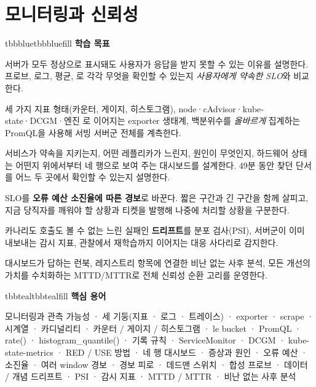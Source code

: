 \setcounter{chapter}{13}
\chapter{모니터링과 신뢰성}

\begin{calloutbox}{tbbblue}{tbbbluefill}
{\normalsize\bfseries\color{tbbblue}학습 목표}\par\vspace{3pt}
\begin{tbbitemize}
  \item 서버가 모두 정상으로 표시돼도 사용자가 응답을 받지 못할 수 있는 이유를 설명한다. 프로브, 로그, 평균, 로 각각 무엇을 확인할 수 있는지 \textit{사용자에게 약속한 SLO}와 비교한다.
  \item 세 가지 지표 형태(카운터, 게이지, 히스토그램), node·cAdvisor·kube-state·DCGM·엔진 로 이어지는 exporter 생태계, 백분위수를 \textit{올바르게} 집계하는 PromQL을 사용해 서빙 서버군 전체를 계측한다.
  \item 서비스가 약속을 지키는지, 어떤 레플리카가 느린지, 원인이 무엇인지, 하드웨어 상태는 어떤지 위에서부터 네 행으로 보여 주는 대시보드를 설계한다. 49분 동안 찾던 단서를 어느 두 곳에서 확인할 수 있는지 설명한다.
  \item SLO를 \textbf{오류 예산 소진율에 따른 경보}로 바꾼다. 짧은 구간과 긴 구간을 함께 살피고, 지금 당직자를 깨워야 할 상황과 티켓을 발행해 나중에 처리할 상황을 구분한다.
  \item 카나리도 호출도 볼 수 없는 느린 실패인 \textbf{드리프트}를 분포 검사(PSI), 서버군이 이미 내보내는 감시 지표, 관찰에서 재학습까지 이어지는 대응 사다리로 감지한다.
  \item 대시보드가 답하는 런북, 레지스트리 항목에 연결한 비난 없는 사후 분석, 모든 개선의 가치를 수치화하는 MTTD/MTTR로 전체 신뢰성 순환 고리를 운영한다.
\end{tbbitemize}
\end{calloutbox}

\vspace{2.5pt}

\begin{calloutbox}{tbbteal}{tbbtealfill}
{\normalsize\bfseries\color{tbbteal}핵심 용어}\par\vspace{3pt}
모니터링과 관측 가능성 · 세 기둥(지표 · 로그 · 트레이스) · exporter · scrape · 시계열 · 카디널리티 · 카운터 / 게이지 / 히스토그램 · le bucket · PromQL · rate() · histogram\_quantile() · 기록 규칙 · ServiceMonitor · DCGM · kube-state-metrics · RED / USE 방법 · 네 행 대시보드 · 증상과 원인 · 오류 예산 · 소진율 · 여러 window 경보 · 경보 피로 · 데드맨 스위치 · 합성 프로브 · 데이터 / 개념 드리프트 · PSI · 감시 지표 · MTTD / MTTR · 비난 없는 사후 분석
\end{calloutbox}

